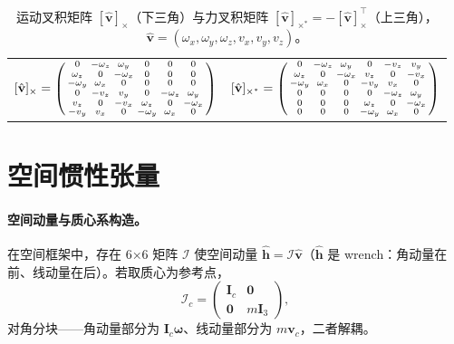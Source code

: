 \begin{table}[H]\centering\footnotesize
\caption{运动叉积矩阵 $[\hat{\mathbf v}]_\times$（下三角）与力叉积矩阵 $[\hat{\mathbf v}]_{\times^*}=-[\hat{\mathbf v}]_\times^\top$（上三角），$\hat{\mathbf v}=(\omega_x,\omega_y,\omega_z,v_x,v_y,v_z)$。}
\label{tab:sva-cross-explicit}
\renewcommand{\arraystretch}{1.15}
\begin{tabular}{cc}
$[\hat{\mathbf v}]_\times=\begin{psmallmatrix}
0&-\omega_z&\omega_y&0&0&0\\
\omega_z&0&-\omega_x&0&0&0\\
-\omega_y&\omega_x&0&0&0&0\\
0&-v_z&v_y&0&-\omega_z&\omega_y\\
v_z&0&-v_x&\omega_z&0&-\omega_x\\
-v_y&v_x&0&-\omega_y&\omega_x&0
\end{psmallmatrix}$
&
$[\hat{\mathbf v}]_{\times^*}=\begin{psmallmatrix}
0&-\omega_z&\omega_y&0&-v_z&v_y\\
\omega_z&0&-\omega_x&v_z&0&-v_x\\
-\omega_y&\omega_x&0&-v_y&v_x&0\\
0&0&0&0&-\omega_z&\omega_y\\
0&0&0&\omega_z&0&-\omega_x\\
0&0&0&-\omega_y&\omega_x&0
\end{psmallmatrix}$
\end{tabular}
\end{table}

\section{空间惯性张量}
\label{sec:sva-inertia}

\paragraph{空间动量与质心系构造。}
在空间框架中，存在 6×6 矩阵 $\mathcal I$ 使空间动量 $\hat{\mathbf h}=\mathcal I\hat{\mathbf v}$（$\hat{\mathbf h}$ 是 wrench：角动量在前、线动量在后）。若取质心为参考点，
\begin{equation}
  \mathcal I_c=\begin{pmatrix}\mathbf I_c&\mathbf 0\\ \mathbf 0&m\mathbf I_3\end{pmatrix},
  \label{eq:sva-Ic}
\end{equation}
对角分块——角动量部分为 $\mathbf I_c\boldsymbol\omega$、线动量部分为 $m\mathbf v_c$，二者解耦。

